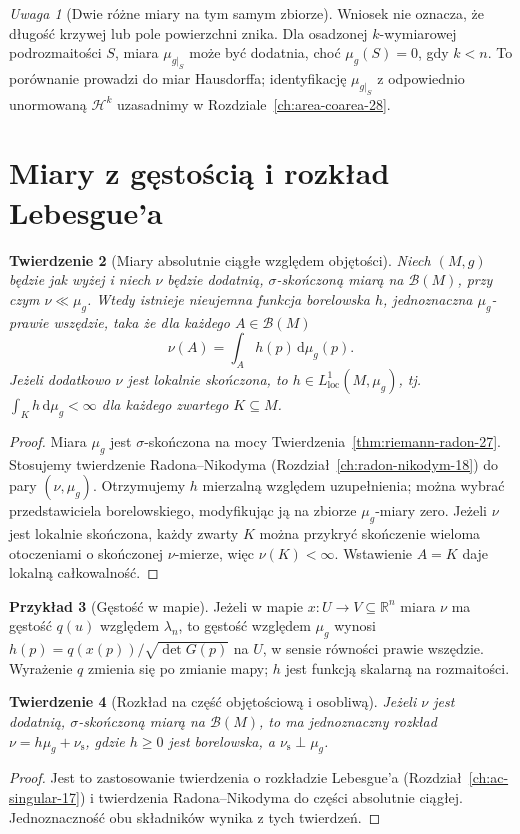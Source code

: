 \documentclass[11pt,a4paper,oneside]{book}
\numberwithin{equation}{chapter}
\theoremstyle{plain}
\newtheorem{twierdzenie}{Twierdzenie}[chapter]
\theoremstyle{definition}
\newtheorem{przyklad}[twierdzenie]{Przykład}
\theoremstyle{remark}
\newtheorem{uwaga}[twierdzenie]{Uwaga}
\begin{document}
\begin{uwaga}[Dwie różne miary na tym samym zbiorze]
Wniosek nie oznacza, że długość krzywej lub pole
powierzchni znika. Dla osadzonej $k$-wymiarowej
podrozmaitości $S$, miara $\mu_{g|_S}$ może być
dodatnia, choć $\mu_g(S)=0$, gdy $k<n$.
To porównanie prowadzi do miar Hausdorffa;
identyfikację $\mu_{g|_S}$ z odpowiednio
unormowaną $\mathcal H^k$ uzasadnimy
w Rozdziale~\ref{ch:area-coarea-28}.
\end{uwaga}

\section{Miary z gęstością i rozkład Lebesgue'a}
\begin{twierdzenie}[Miary absolutnie ciągłe względem objętości]
\label{thm:rn-manifold-27}
Niech $(M,g)$ będzie jak wyżej i niech
$\nu$ będzie dodatnią, $\sigma$-skończoną
miarą na $\mathcal B(M)$, przy czym
$\nu\ll\mu_g$. Wtedy istnieje nieujemna funkcja
borelowska $h$, jednoznaczna $\mu_g$-prawie
wszędzie, taka że dla każdego $A\in\mathcal B(M)$
\[
 \nu(A)=\int_A h(p)\,\mathrm d\mu_g(p).
\]
Jeżeli dodatkowo $\nu$ jest lokalnie skończona,
to $h\in L^1_{\mathrm{loc}}(M,\mu_g)$,
tj. $\int_K h\,\mathrm d\mu_g<\infty$
dla każdego zwartego $K\subseteq M$.
\end{twierdzenie}
\begin{proof}
Miara $\mu_g$ jest $\sigma$-skończona na mocy
Twierdzenia~\ref{thm:riemann-radon-27}.
Stosujemy twierdzenie Radona--Nikodyma
(Rozdział~\ref{ch:radon-nikodym-18})
do pary $(\nu,\mu_g)$. Otrzymujemy $h$ mierzalną
względem uzupełnienia; można wybrać przedstawiciela
borelowskiego, modyfikując ją na zbiorze
$\mu_g$-miary zero. Jeżeli $\nu$ jest lokalnie
skończona, każdy zwarty $K$ można przykryć
skończenie wieloma otoczeniami o skończonej
$\nu$-mierze, więc $\nu(K)<\infty$.
Wstawienie $A=K$ daje lokalną całkowalność.
\end{proof}

\begin{przyklad}[Gęstość w mapie]
Jeżeli w mapie $x:U\to V\subseteq\mathbb R^n$
miara $\nu$ ma gęstość $q(u)$ względem $\lambda_n$,
to gęstość względem $\mu_g$ wynosi
$h(p)=q(x(p))/\sqrt{\det G(p)}$
na $U$, w sensie równości prawie wszędzie.
Wyrażenie $q$ zmienia się po zmianie mapy;
$h$ jest funkcją skalarną na rozmaitości.
\end{przyklad}

\begin{twierdzenie}[Rozkład na część objętościową i osobliwą]
\label{thm:leb-manifold-27}
Jeżeli $\nu$ jest dodatnią, $\sigma$-skończoną
miarą na $\mathcal B(M)$, to ma jednoznaczny rozkład
$\nu=h\mu_g+\nu_{\mathrm s}$, gdzie
$h\ge0$ jest borelowska, a
$\nu_{\mathrm s}\perp\mu_g$.
\end{twierdzenie}
\begin{proof}
Jest to zastosowanie twierdzenia o rozkładzie
Lebesgue'a (Rozdział~\ref{ch:ac-singular-17})
i twierdzenia Radona--Nikodyma do części
absolutnie ciągłej. Jednoznaczność obu składników
wynika z tych twierdzeń.
\end{proof}
\end{document}
